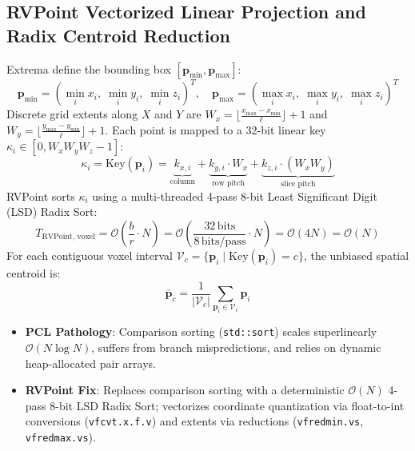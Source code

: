 \documentclass[11pt,a4paper]{article}
\begin{document}
\subsection{RVPoint Vectorized Linear Projection and Radix Centroid Reduction}
Extrema define the bounding box $[\bm{p}_{\min}, \bm{p}_{\max}]$:
\begin{equation}
\bm{p}_{\min} = (\min_i x_i, \; \min_i y_i, \; \min_i z_i)^T, \quad \bm{p}_{\max} = (\max_i x_i, \; \max_i y_i, \; \max_i z_i)^T
\end{equation}
Discrete grid extents along $X$ and $Y$ are $W_x = \lfloor \frac{x_{\max} - x_{\min}}{\ell} \rfloor + 1$ and $W_y = \lfloor \frac{y_{\max} - y_{\min}}{\ell} \rfloor + 1$. Each point is mapped to a 32-bit linear key $\kappa_i \in [0, W_x W_y W_z - 1]$:
\begin{equation}
\kappa_i = \text{Key}(\bm{p}_i) = \underbrace{k_{x,i}}_{\text{column}} + \underbrace{k_{y,i} \cdot W_x}_{\text{row pitch}} + \underbrace{k_{z,i} \cdot (W_x W_y)}_{\text{slice pitch}}
\label{eq:voxel_linear_key}
\end{equation}
RVPoint sorts $\kappa_i$ using a multi-threaded 4-pass 8-bit Least Significant Digit (LSD) Radix Sort:
\begin{equation}
T_{\text{RVPoint, voxel}} = \mathcal{O}\left( \frac{b}{r} \cdot N \right) = \mathcal{O}\left( \frac{32\,\text{bits}}{8\,\text{bits/pass}} \cdot N \right) = \mathcal{O}(4N) = \mathcal{O}(N)
\end{equation}
For each contiguous voxel interval $\mathcal{V}_c = \{ \bm{p}_i \mid \text{Key}(\bm{p}_i) = c \}$, the unbiased spatial centroid is:
\begin{equation}
\bar{\bm{p}}_c = \frac{1}{|\mathcal{V}_c|} \sum_{\bm{p}_i \in \mathcal{V}_c} \bm{p}_i
\end{equation}

\begin{tcolorbox}[fixcmp, title={Stage Comparison: Voxel Downsampling}]
\begin{itemize}[leftmargin=1.2em, itemsep=0.1em]
    \item \textbf{PCL Pathology}: Comparison sorting (\texttt{std::sort}) scales superlinearly $\mathcal{O}(N \log N)$, suffers from branch mispredictions, and relies on dynamic heap-allocated pair arrays.
    \item \textbf{RVPoint Fix}: Replaces comparison sorting with a deterministic $\mathcal{O}(N)$ 4-pass 8-bit LSD Radix Sort; vectorizes coordinate quantization via float-to-int conversions (\texttt{vfcvt.x.f.v}) and extents via reductions (\texttt{vfredmin.vs}, \texttt{vfredmax.vs}).
\end{itemize}
\end{tcolorbox}
\end{document}
